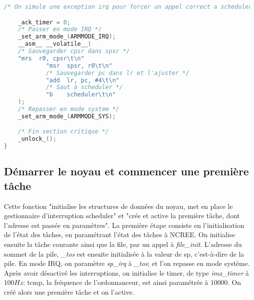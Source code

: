 \documentclass{article}
\begin{document}
\begin{lstlisting}[language=C, caption=noyau.c]
    /* On simule une exception irq pour forcer un appel correct a scheduler().*/

    _ack_timer = 0;
    /* Passer en mode IRQ */
    _set_arm_mode_(ARMMODE_IRQ);
    __asm__ __volatile__(
    /* Sauvegarder cpsr dans spsr */
    "mrs  r0, cpsr\t\n"
            "msr  spsr, r0\t\n"
            /* Sauvegarder pc dans lr et l'ajuster */
            "add  lr, pc, #4\t\n"
            /* Saut à scheduler */
            "b    scheduler\t\n"
    );
    /* Repasser en mode system */
    _set_arm_mode_(ARMMODE_SYS);

    /* Fin section critique */
    _unlock_();
}
\end{lstlisting}



\subsection{Démarrer le noyau et commencer une première tâche}
Cette fonction "initialise les structures de données du noyau, met en place le gestionnaire d’interruption scheduler" et "crée et active la première tâche, dont l’adresse est passée en paramètres".
La première étape consiste en l'initialisation de l'état des tâches, en paramétrant l'état des tâches à NCREE. On initialise ensuite la tâche courante ainsi que la file, par un appel à \textit{file\_init}. L'adresse du sommet de la pile, \textit{\_tos} est ensuite initialisée à la valeur de sp, c'est-à-dire de la pile. En mode IRQ, on paramètre \textit{sp\_irq} à \textit{\_tos}; et l'on repasse en mode système. Après avoir désactivé les interruptions, on initialise le timer, de type \textit{imx\_timer} à $100Hz$: tcmp, la fréquence de l'ordonnanceur, est ainsi paramétrée à $10000$. On créé alors une première tâche et on l'active.
\end{document}
